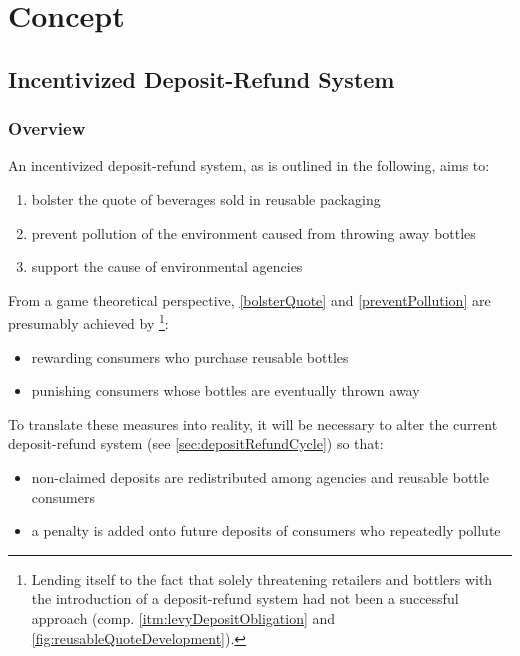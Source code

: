 
\chapter{Concept}
\label{chp:concept}

\section{Incentivized Deposit-Refund System}

\subsection{Overview}
An incentivized deposit-refund system, as is outlined in the following, aims to:

\begin{enumerate}[label=(\Alph*)]
  \item \label{bolsterQuote} bolster the quote of beverages sold in reusable packaging
  \item \label{preventPollution} prevent pollution of the environment caused from throwing away bottles
  \item support the cause of environmental agencies
\end{enumerate}

From a game theoretical perspective, \ref{bolsterQuote} and \ref{preventPollution} are presumably achieved by \footnote{Lending itself to the fact that solely threatening retailers and bottlers with the introduction of a deposit-refund system had not been a successful approach (comp. \ref{itm:levyDepositObligation} and \autoref{fig:reusableQuoteDevelopment}).}:

\begin{itemize}
  \item rewarding consumers who purchase reusable bottles
  \item punishing consumers whose bottles are eventually thrown away
\end{itemize}

To translate these measures into reality, it will be necessary to alter the current deposit-refund system (see \ref{sec:depositRefundCycle}) so that:

\begin{itemize}
  \item non-claimed deposits are redistributed among agencies and reusable bottle consumers
  \item a penalty is added onto future deposits of consumers who repeatedly pollute
\end{itemize}

